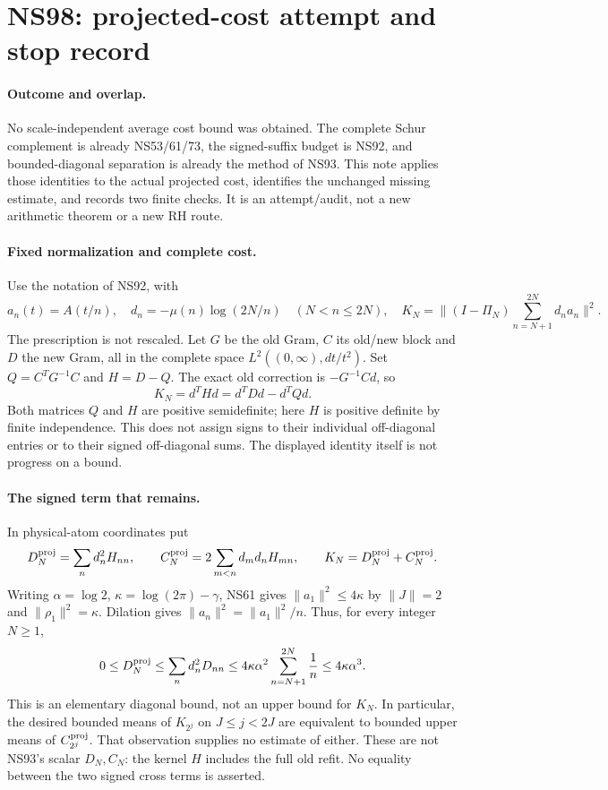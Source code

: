 \section*{NS98: projected-cost attempt and stop record}

\paragraph{Outcome and overlap.}
No scale-independent average cost bound was obtained. The complete Schur
complement is already NS53/61/73, the signed-suffix budget is NS92, and
bounded-diagonal separation is already the method of NS93. This note
applies those identities to the actual projected cost, identifies the
unchanged missing estimate, and records two finite checks. It is an
attempt/audit, not a new arithmetic theorem or a new RH route.

\paragraph{Fixed normalization and complete cost.}
Use the notation of NS92, with
\[
 a_n(t)=A(t/n),\quad d_n=-\mu(n)\log(2N/n)\quad(N<n\le2N),
 \quad K_N=\|(I-\Pi_N)\sum_{n=N+1}^{2N}d_na_n\|^2.
\]
The prescription is not rescaled. Let $G$ be the old Gram, $C$ its
old/new block and $D$ the new Gram, all in the complete space
$L^2((0,\infty),dt/t^2)$. Set $Q=C^TG^{-1}C$ and $H=D-Q$.
The exact old correction is $-G^{-1}Cd$, so
\[
 K_N=d^THd=d^TDd-d^TQd.
\]
Both matrices $Q$ and $H$ are positive semidefinite; here $H$ is positive
definite by finite independence. This does not assign signs to their
individual off-diagonal entries or to their signed off-diagonal sums.
The displayed identity itself is not progress on a bound.

\paragraph{The signed term that remains.}
In physical-atom coordinates put
\[
 D_N^{\rm proj}=\sum_n d_n^2H_{nn},\qquad
 C_N^{\rm proj}=2\sum_{m<n}d_md_nH_{mn},\qquad
 K_N=D_N^{\rm proj}+C_N^{\rm proj}.
\]
Writing $\alpha=\log2$, $\kappa=\log(2\pi)-\gamma$,
NS61 gives $\|a_1\|^2\le4\kappa$ by $\|J\|=2$ and
$\|\rho_1\|^2=\kappa$. Dilation gives $\|a_n\|^2=\|a_1\|^2/n$.
Thus, for every integer $N\ge1$,
\[
 0\le D_N^{\rm proj}\le
 \sum_n d_n^2D_{nn}\le
 4\kappa\alpha^2\sum_{n=N+1}^{2N}\frac1n
 \le4\kappa\alpha^3.
\]
This is an elementary diagonal bound, not an upper bound for $K_N$.
In particular, the desired bounded means of $K_{2^j}$ on
$J\le j<2J$ are equivalent to bounded upper means of
$C_{2^j}^{\rm proj}$. That observation supplies no estimate of either.
These are not NS93's scalar $D_N,C_N$: the kernel $H$ includes the full
old refit. No equality between the two signed cross terms is asserted.

